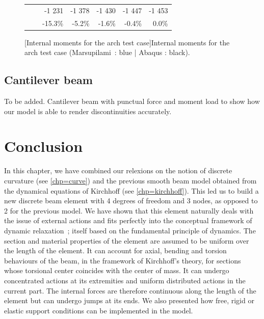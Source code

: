 \begin{figure}[p]
\begin{fullpage}
\begin{tabularx}{0.65\textwidth}{@{} XX rrrrr@{}}
&&{\color{black}\normalsize-1 231}&{\color{black}\normalsize-1 378}&{\color{black}\normalsize-1 430}&{\color{black}\normalsize-1 447}&{\color{black}\normalsize-1 453}\\
&&{\color{black}\scriptsize-15.3\%}&{\color{black}\scriptsize-5.2\%}&{\color{black}\scriptsize-1.6\%}&{\color{black}\scriptsize-0.4\%}&{\color{black}\scriptsize0.0\%}\\\bottomrule
\end{tabularx}
[Internal moments for the arch test case]{Internal moments for the arch test case (Marsupilami~: blue | Abaqus : black).}
\label{tab:resA_moment}
	\end{fullpage}
\end{figure}
\clearpage
\subsection{Cantilever beam}
To be added. Cantilever beam with punctual force and moment load to show how our model is able to render discontinuities accurately.

\section{Conclusion}

In this chapter, we have combined our relexions on the notion of discrete curvature (see \cref{chp=curve}) and the previous smooth beam model obtained from the dynamical equations of Kirchhoff (see \cref{chp=kirchhoff}). This led us to build a new discrete beam element with 4 degrees of freedom and 3 nodes, as opposed to 2 for the previous model. We have shown that this element naturally deals with the issue of external actions and fits perfectly into the conceptual framework of dynamic relaxation~; itself based on the fundamental principle of dynamics. The section and material properties of the element are assumed to be uniform over the length of the element. It can account for axial, bending and torsion behaviours of the beam, in the framework of Kirchhoff's theory, for sections whose torsional center coincides with the center of mass. It can undergo concentrated actions at its extremities and uniform distributed actions in the current part. The internal forces are therefore continuous along the length of the element but can undergo jumps at its ends. We also presented how free, rigid or elastic support conditions can be implemented in the model.

